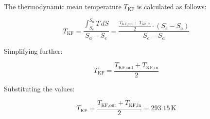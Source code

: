 The thermodynamic mean temperature \( T_{\text{KF}} \) is calculated as follows:  

\[
T_{\text{KF}} = \frac{\int_{S_e}^{S_a} T \, dS}{S_a - S_e} = \frac{\frac{T_{\text{KF,out}} + T_{\text{KF,in}}}{2} \cdot (S_e - S_a)}{S_e - S_a}
\]

Simplifying further:  

\[
T_{\text{KF}} = \frac{T_{\text{KF,out}} + T_{\text{KF,in}}}{2}
\]

Substituting the values:  

\[
T_{\text{KF}} = \frac{T_{\text{KF,out}} + T_{\text{KF,in}}}{2} = 293.15 \, \text{K}
\]